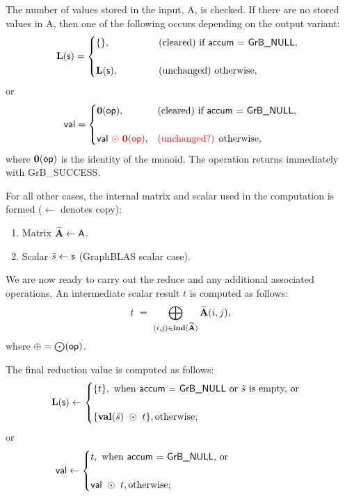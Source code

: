 The number of values stored in the input, {\sf A}, is checked.  If there are no stored values in {\sf A}, then one of the following occurs depending on the output variant:
\[ 
{\sf {\bf L}(s)} =
\begin{cases}
    \{\}, & \mbox{(cleared) if {\sf accum} = {\sf GrB\_NULL}}, ~~\\ & \\
    {\sf {\bf L}(s)}, ~~~ ~~~~~~~ & \mbox{(unchanged) otherwise,}
\end{cases}
\]
or
\[ 
{\sf val} =
\begin{cases}
    \bold{0}({\sf op}), & \mbox{(cleared) if {\sf accum} = {\sf GrB\_NULL}}, \\ & \\
    {\sf val}{\color{red} ~\odot~ {\bf 0}({\sf op})}, & \mbox{{\color{red}(unchanged?)} otherwise,}
\end{cases}
\]
where $\bold{0}({\sf op})$ is the identity of the monoid. The operation returns immediately with {\sf GrB\_SUCCESS}.

For all other cases, the internal matrix and scalar used in 
the computation is formed ($\leftarrow$ denotes copy):
\begin{enumerate}
	\item Matrix ${\bf \widetilde{A}} \leftarrow {\sf A}$.
    \item Scalar ${\tilde{s}} \leftarrow {\sf s}$ (GraphBLAS scalar case).
\end{enumerate}

We are now ready to carry out the reduce and any additional associated operations.  
An intermediate scalar result $t$ is computed as follows:
\[ 
t ~ = ~
    \bigoplus\limits_{(i, j) \in \bold{ind}({\bf \widetilde{A}})} {\bf \widetilde{A}}(i, j),
\]
where $\oplus = \bigodot({\sf op})$.

The final reduction value is computed as follows:
\[
{\sf {\bf L}(s)} \leftarrow
    \begin{cases}
    \{ t \}, \text{ when {\sf accum = GrB\_NULL} or ${\tilde{s}}$ is empty, or} \\ & \\
    \{ {\bf val}({\tilde{s}}) ~\odot ~ t \}, \text{otherwise;} \\
    \end{cases}
\]
or 
\[
{\sf val} \leftarrow
    \begin{cases}
    t, \text{ when {\sf accum = GrB\_NULL}, or} \hspace*{0.95in} \\ & \\
    {\sf val} ~\odot ~t, \text{otherwise;} \\
    \end{cases}
\]

